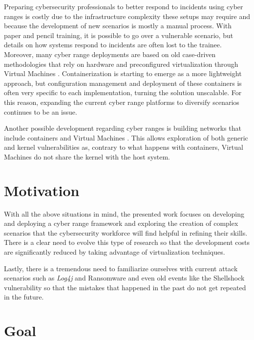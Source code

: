 Preparing cybersecurity professionals to better respond to incidents using cyber ranges is costly due to the infrastructure complexity these setups may require and because the development of new scenarios is mostly a manual process. With paper and pencil training, it is possible to go over a vulnerable scenario, but details on how systems respond to incidents are often lost to the trainee. Moreover, many cyber range deployments are based on old case-driven methodologies that rely on hardware \cite{national_cr_ref} and preconfigured virtualization through Virtual Machines \cite{cyris_ref, cytrone_ref, leaf_ref}. Containerization is starting to emerge \cite{dsp_ref, cyexec_ref} as a more lightweight approach, but configuration management and deployment of these containers is often very specific to each implementation, turning the solution unscalable. For this reason, expanding the current cyber range platforms to diversify scenarios continues to be an issue.

Another possible development regarding cyber ranges is building networks that include containers and Virtual Machines \cite{capturing_flags_ref}. This allows exploration of both generic and kernel vulnerabilities as, contrary to what happens with containers, Virtual Machines do not share the kernel with the host system.

\section{Motivation} \label{sec:motivation}

With all the above situations in mind, the presented work focuses on developing and deploying a cyber range framework and exploring the creation of complex scenarios that the cybersecurity workforce will find helpful in refining their skills. There is a clear need to evolve this type of research so that the development costs are significantly reduced by taking advantage of virtualization techniques.

Lastly, there is a tremendous need to familiarize ourselves with current attack scenarios such as \textit{Log4j} and Ransomware and even old events like the Shellshock vulnerability so that the mistakes that happened in the past do not get repeated in the future.

\section{Goal} \label{sec:goal}

